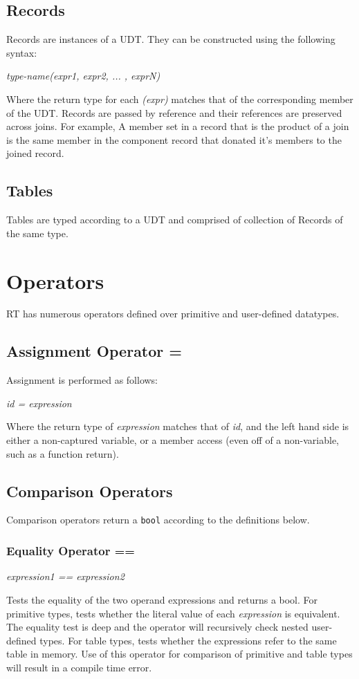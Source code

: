 \subsection{Records}
Records are instances of a UDT. They can be constructed using the following
syntax:\\
\begin{center}
	\textsl{type-name(expr1, expr2, ... , exprN)}
\end{center}
Where the return type for each \textsl{(expr)} matches that of the corresponding member of the
UDT.  Records are passed by reference and their references are preserved across joins.  For example,
A member set in a record that is the product of a join is the same member in the component record that donated
it's members to the joined record.

\subsection{Tables}
Tables are typed according to a UDT and comprised of collection of Records of the same
type.

\section{Operators}
RT has numerous operators defined over primitive and user-defined datatypes.

\subsection{Assignment Operator =}
Assignment is performed as follows:
\begin{center}
\textsl{id = expression}
\end{center}
Where the return type of \textsl{expression} matches that of \textsl{id}, and the left hand side is either
a non-captured variable, or a member access (even off of a non-variable, such as a function return).

\subsection{Comparison Operators}
Comparison operators return a \texttt{bool} according to the definitions below. 
\subsubsection{Equality Operator ==}
\begin{center}
\textsl{expression1 == expression2}
\end{center}
Tests the equality of the two operand expressions and returns a bool. For primitive types, 
tests whether the literal value of each \textsl{expression} is equivalent. The equality 
test is deep and the operator will recursively check nested user-defined types. For table 
types, tests whether the expressions refer to the same table in memory. Use of this operator 
for comparison of primitive and table types will result in a compile time error.


